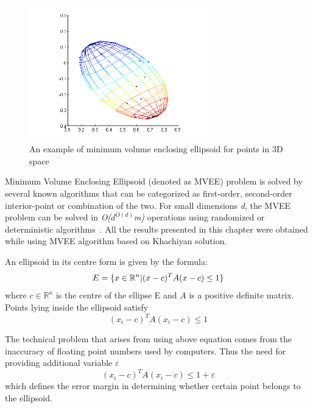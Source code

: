 \begin{figure}[htp]
	\centering
	\includegraphics[width=0.70\textwidth]{Figures/minimum_bounding_ellipsoid.png}
	\caption{An example of minimum volume enclosing ellipsoid for points in 3D space}
	\label{fig:minimum_bounding_ellipsoid_visualization}\vspace{-3pt}
\end{figure}

Minimum Volume Enclosing Ellipsoid (denoted as MVEE) problem is solved by several known algorithms that can be categorized as first-order, second-order interior-point or combination of the two. For small dimensions \textit{d}, the MVEE problem can be solved in \textit{O($d^{O(d)}$m)} operations using randomized or deterministic algorithms~\cite{MVEEMichaelTodd2005}. All the results presented in this chapter were obtained while using MVEE algorithm based on Khachiyan solution.

An ellipsoid in its centre form is given by the formula:
\vspace{-6pt} 
\[ 
\vspace{-3pt}
E = \{x \in \mathbb{R}^{n} | (x - c)^{T}A(x-c) \le 1\} 
\vspace{-3pt}
\] 
where $c \in \mathbb{R}^{n}$ is the centre of the ellipse E and $ A $ is a positive definite matrix. Points lying inside the ellipsoid satisfy 
\begin{equation}(x_{i} - c)^{T}A(x_{i} - c) \le 1\end{equation} 

The technical problem that arises from using above equation comes from the inaccuracy of floating point numbers used by computers. Thus the need for providing additional variable $\varepsilon$
\begin{equation}\label{eq:ellipsoid_affiliation}(x_{i} - c)^{T}A(x_{i} - c) \le 1 + \varepsilon\end{equation} 
which defines the error margin in determining whether certain point belongs to the ellipsoid.

